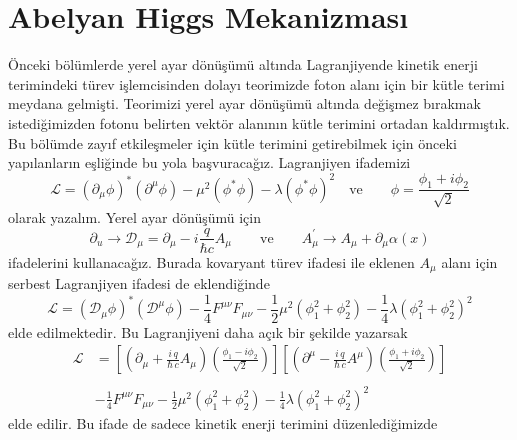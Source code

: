 \section{Abelyan Higgs Mekanizması}
Önceki bölümlerde yerel ayar dönüşümü altında Lagranjiyende kinetik enerji terimindeki türev işlemcisinden dolayı teorimizde foton alanı için bir kütle terimi meydana gelmişti. Teorimizi yerel ayar dönüşümü altında değişmez bırakmak istediğimizden fotonu belirten vektör alanının kütle terimini ortadan kaldırmıştık. Bu bölümde zayıf etkileşmeler için kütle terimini getirebilmek için önceki yapılanların eşliğinde bu yola başvuracağız. Lagranjiyen ifademizi
\begin{equation} \label{abe1}
\mathcal{L} = \left( \partial_{\mu} \phi \right)^{*} \left( \partial^{\mu} \phi \right) - \mu^{2}(\phi^{*}\phi) - \lambda (\phi^{*}\phi)^2 \quad \textrm{ve} \qquad \phi = \frac{\phi_{1}+i \phi_{2}}{\sqrt{2}}
\end{equation}
olarak yazalım. Yerel ayar dönüşümü için
\begin{equation} \label{abe2}
\partial_{u} \to \mathcal{D}_{\mu} = \partial_{\mu} - i \frac{q}{\hbar c} A_{\mu} \qquad \textrm{ve} \qquad A^{'}_{\mu} \to A_{\mu} + \partial_{\mu} \alpha(x)
\end{equation} 
ifadelerini kullanacağız. Burada kovaryant türev ifadesi ile eklenen  $A_{\mu} $ alanı için serbest Lagranjiyen ifadesi de eklendiğinde
$$
\mathcal{L} = \left( \mathcal{D}_{\mu} \phi \right)^{*}  \left( \mathcal{D}^{\mu} \phi \right) - \frac{1}{4} F^{\mu \nu} F_{\mu \nu} - \frac{1}{2} \mu^{2} \left( \phi_{1}^{2} + \phi_{2}^{2} \right) - \frac{1}{4} \lambda \left( \phi_{1}^{2} + \phi_{2}^{2} \right)^{2}	
$$
elde edilmektedir. Bu Lagranjiyeni daha açık bir şekilde yazarsak
\begin{equation} \label{abe3}
\begin{aligned}
\mathcal{L} &= \left[ \left( \partial_{\mu} + \frac{i\,q}{\hbar \, c} A_{\mu} \right) \left(\frac{\phi_{1} - i \phi_{2}}{\sqrt{2}} \right) \right] \left[ \left( \partial^{\mu} - \frac{i\,q}{\hbar \, c} A^{\mu} \right) \left(\frac{\phi_{1} + i \phi_{2}}{\sqrt{2}} \right) \right] \\
\\
& - \frac{1}{4} F^{\mu \nu} F_{\mu \nu} - \frac{1}{2} \mu^{2} \left( \phi_{1}^{2} + \phi_{2}^{2} \right) - \frac{1}{4} \lambda \left( \phi_{1}^{2} + \phi_{2}^{2} \right)^{2}
\end{aligned}
\end{equation}
elde edilir. Bu ifade de sadece kinetik enerji terimini düzenlediğimizde
